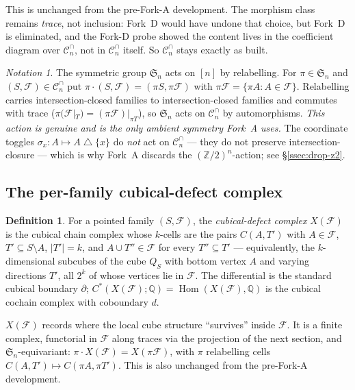 \documentclass[11pt,oneside]{amsart}
\theoremstyle{plain}
\theoremstyle{definition}
\newtheorem{definition}[theorem]{Definition}
\theoremstyle{remark}
\newtheorem{notation}[theorem]{Notation}
\theoremstyle{honeststyle}
\newcommand{\F}{\mathcal{F}}
\newcommand{\Sym}{\mathfrak{S}}
\newcommand{\Z}{\mathbb{Z}}
\newcommand{\Q}{\mathbb{Q}}
\newcommand{\Cn}{\mathcal{C}^{\cap}_n}
\DeclareMathOperator{\Hom}{Hom}
\begin{document}
This is unchanged from the pre-Fork-A development. The morphism class
remains \emph{trace}, not inclusion: Fork~D would have undone that
choice, but Fork~D is eliminated, and the Fork-D probe showed the
content lives in the coefficient diagram over $\Cn$, not in $\Cn$
itself. So $\Cn$ stays exactly as built.

\begin{notation}
\label{not:sn}
The symmetric group $\Sym_n$ acts on $[n]$ by relabelling. For
$\pi\in\Sym_n$ and $(S,\F)\in\Cn$ put $\pi\cdot(S,\F)=(\pi
S,\pi\F)$ with $\pi\F=\{\pi A:A\in\F\}$. Relabelling carries
intersection-closed families to intersection-closed families and
commutes with trace ($\pi(\F|_T)=(\pi\F)|_{\pi T}$), so $\Sym_n$ acts
on $\Cn$ by automorphisms. \emph{This action is genuine and is the
only ambient symmetry Fork~A uses.} The coordinate toggles
$\sigma_x\colon A\mapsto A\bigtriangleup\{x\}$ do \emph{not} act on
$\Cn$ --- they do not preserve intersection-closure --- which is why
Fork~A discards the $(\Z/2)^n$-action; see \S\ref{ssec:drop-z2}.
\end{notation}

\subsection{The per-family cubical-defect complex}
\label{ssec:per-family}

\begin{definition}
\label{def:xf}
For a pointed family $(S,\F)$, the \emph{cubical-defect complex}
$X(\F)$ is the cubical chain complex whose $k$-cells are the pairs
$C(A,T')$ with $A\in\F$, $T'\subseteq S\setminus A$, $|T'|=k$, and
$A\cup T''\in\F$ for every $T''\subseteq T'$ --- equivalently, the
$k$-dimensional subcubes of the cube $Q_S$ with bottom vertex $A$ and
varying directions $T'$, all $2^{k}$ of whose vertices lie in $\F$.
The differential is the standard cubical boundary $\partial$;
$C^{*}(X(\F);\Q)=\Hom(X(\F),\Q)$ is the cubical cochain complex with
coboundary $d$.
\end{definition}

$X(\F)$ records where the local cube structure ``survives'' inside
$\F$. It is a finite complex, functorial in $\F$ along traces via the
projection of the next section, and $\Sym_n$-equivariant:
$\pi\cdot X(\F)=X(\pi\F)$, with $\pi$ relabelling cells
$C(A,T')\mapsto C(\pi A,\pi T')$. This is also unchanged from the
pre-Fork-A development.

\end{document}
